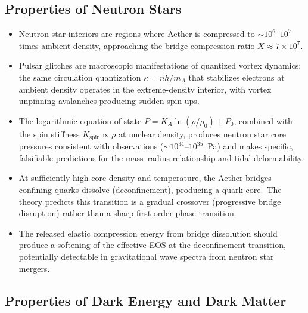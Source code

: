 ﻿\documentclass[12pt,letterpaper]{article}
\newcommand{\Ka}{K_{\!A}}
\begin{document}
\subsection{Properties of Neutron Stars}

\begin{itemize}[leftmargin=2em]
  \item Neutron star interiors are regions where Aether is compressed to
    $\sim 10^6$--$10^7$ times ambient density, approaching the bridge
    compression ratio $X \approx 7 \times 10^7$.
  \item Pulsar glitches are macroscopic manifestations of quantized vortex
    dynamics: the same circulation quantization $\kappa = nh/m_A$ that
    stabilizes electrons at ambient density operates in the extreme-density
    interior, with vortex unpinning avalanches producing sudden spin-ups.
  \item The logarithmic equation of state $P = \Ka \ln(\rho/\rho_0) + P_0$,
    combined with the spin stiffness $K_{\mathrm{spin}} \propto \rho$ at
    nuclear density, produces neutron star core pressures consistent with
    observations ($\sim 10^{34}$--$10^{35}$~Pa) and makes specific,
    falsifiable predictions for the mass--radius relationship and tidal
    deformability.
  \item At sufficiently high core density and temperature, the Aether bridges
    confining quarks dissolve (deconfinement), producing a quark core.\ The
    theory predicts this transition is a gradual crossover (progressive bridge
    disruption) rather than a sharp first-order phase transition.
  \item The released elastic compression energy from bridge dissolution should
    produce a softening of the effective EOS at the deconfinement transition,
    potentially detectable in gravitational wave spectra from neutron star mergers.
\end{itemize}

\subsection{Properties of Dark Energy and Dark Matter}
\end{document}
